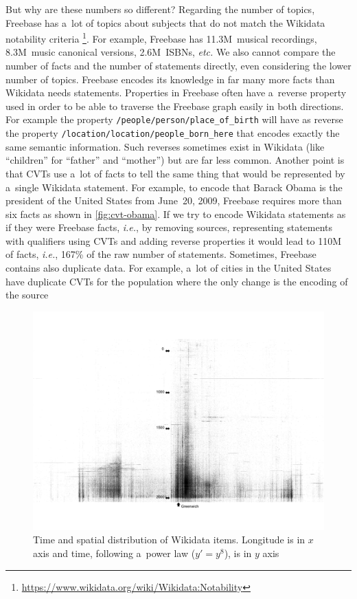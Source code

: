 \documentclass{sig-alternate}
\begin{document}
But why are these numbers so different?
Regarding the number of topics, Freebase has a~lot of topics about subjects
that do not match the Wikidata notability criteria%
\footnote{\url{https://www.wikidata.org/wiki/Wikidata:Notability}}.
For example, Freebase has 11.3M~musical recordings, 8.3M~music canonical versions,
2.6M~ISBNs, \emph{etc.}
We also cannot compare the number of facts and the number of statements directly,
even considering the lower number of topics.
Freebase encodes its knowledge in far many more facts than Wikidata needs statements.
Properties in Freebase often have a~reverse property used in order to be able
to traverse the Freebase graph easily in both directions.
For example the property \texttt{/people/person/place\_of\_birth} will have as reverse
the property \texttt{/location/location/people\_born\_here} that encodes
exactly the same semantic information.
Such reverses sometimes exist in Wikidata (like ``children'' for ``father'' and ``mother'')
but are far less common.
Another point is that CVTs use a~lot of facts to tell the same thing that
would be represented by a~single Wikidata statement.
For example, to encode that Barack Obama is the president of the United States from June~20, 2009,
Freebase requires more than six facts as shown in \autoref{fig:cvt-obama}.
If we try to encode Wikidata statements as if they were Freebase facts, \emph{i.e.},
by removing sources, representing statements with qualifiers using CVTs
and adding reverse properties it would lead to 110M of facts,
\emph{i.e.}, 167\% of the raw number of statements.
Sometimes, Freebase contains also duplicate data.
For example, a~lot of cities in the United States have duplicate CVTs for the population
where the only change is the encoding of the source

\begin{figure}[!htbp]
\centering
\includegraphics[width=8.45 cm]{img/wikidata-time-space.png}
\caption{Time and spatial distribution of Wikidata items.
Longitude is in $x$ axis and time, following a~power law ($y' = y^8$), is in $y$ axis}
\label{fig:time-space-wikidata}
\end{figure}
\end{document}
